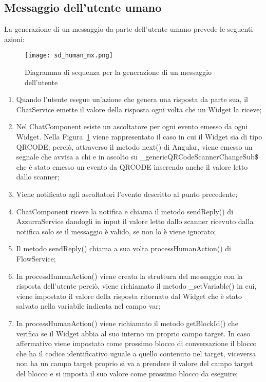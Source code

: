 \subsection{Messaggio dell’utente  umano}
La generazione di un messaggio da parte dell’utente umano prevede le seguenti azioni:\\
\begin{figure}[htbp]
	\centering
	\texttt{[image: sd\_human\_mx.png]}
	\caption{Diagramma di sequenza per la generazione di un messaggio dell'utente}\label{fig:mxHuman}
\end{figure}
\begin{enumerate}
	\item Quando l'utente esegue un'azione che genera una risposta da parte sua, il ChatService emette il valore della risposta ogni volta che un Widget la riceve;
	\item Nel ChatComponent esiste un ascoltatore per ogni evento emesso da ogni Widget. Nella Figura~\ref{fig:mxHuman} viene rappresentato il caso in cui il Widget sia di tipo QRCODE; perciò, attraverso il metodo next() di Angular, viene emesso un segnale che avvisa a chi e in ascolto su \_genericQRCodeScannerChangeSub\$ che è stato emesso un evento da QRCODE inserendo anche il valore letto dallo scanner;
	\item Viene notificato agli ascoltatori l'evento descritto al punto precedente;
	\item ChatComponent riceve la notifica e chiama il metodo sendReply() di AzzurraService dandogli in input il valore letto dallo scanner ricevuto dalla notifica solo se il messaggio è valido, se non lo è viene ignorato;	
	\item Il metodo sendReply() chiama a sua volta processHumanAction() di FlowService;
	\item In processHumanAction() viene creata la struttura del messaggio con la risposta dell'utente perciò, viene richiamato il metodo \_setVariable() in cui, viene impostato il valore della risposta ritornato dal Widget che è stato salvato nella variabile indicata nel campo var;
	\item In processHumanAction() viene richiamato il metodo getBlockId() che verifica se il Widget abbia al suo interno un proprio campo target. In caso affermativo viene impostato come prossimo blocco di conversazione il blocco che ha il codice identificativo uguale a quello contenuto nel target, viceversa non ha un campo target proprio si va a prendere il valore del campo target del blocco e si imposta il suo valore come prossimo blocco da eseguire;

\end{enumerate}
